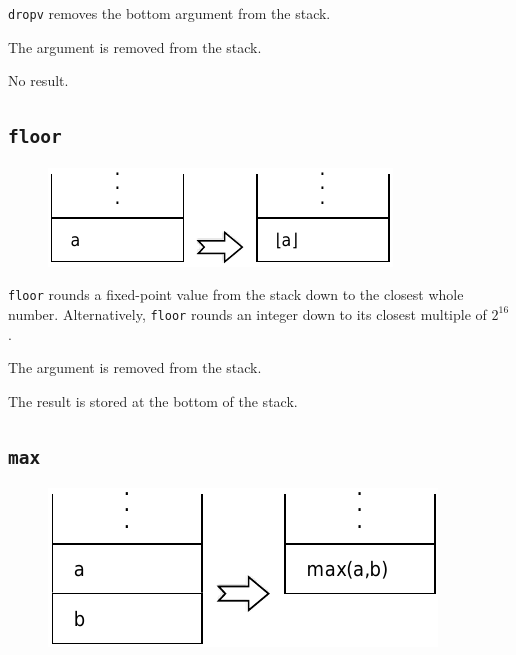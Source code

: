 			\texttt{dropv} removes the bottom argument from the stack.

			The argument is removed from the stack.

			No result.

	\qquad

	\subsection*{\texttt{floor}}
	
		\begin{figure}
			\begin{flushright}
				\includegraphics[width=\linewidth]{figure/pdf/i_floor} 
			\end{flushright}
		\end{figure}
	
			\texttt{floor} rounds a fixed-point value from the stack down to
			the closest whole number. Alternatively, \texttt{floor} rounds an
			integer down to its closest multiple of $2^{16}$.		
	
			The argument is removed from the stack.
			
			The result is stored at the bottom of the stack.
	
	\qquad
	
	\subsection*{\texttt{max}}
	
		\begin{figure}
			\begin{flushright}
				\includegraphics[width=\linewidth]{figure/pdf/i_max} 
			\end{flushright}
		\end{figure}
	
